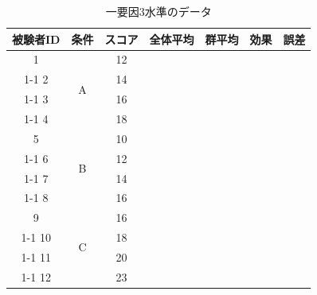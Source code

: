 \documentclass[a4paper,12pt]{ltjarticle}
\begin{document}
\begin{table}[ht]
	\centering
	\caption{一要因3水準のデータ}
	\begin{tabular}{|c|c|c|c|c|c|c|}
		\hline
		被験者ID & 条件 & スコア & 全体平均 & 群平均 & 効果 & 誤差 \\ \hline
		1        & \multirow{4}{*}{A}  & 12   & \multirow{12}{*}{\hspace{2cm}} & \multirow{4}{*}{\hspace{2cm}}  & \multirow{4}{*}{\hspace{2cm}}  & \hspace{2cm}   \\ \cline{1-1}\cline{3-3}\cline{7-7}
		2        &   & 14   &  &   &   & \hspace{2cm}   \\ \cline{1-1}\cline{3-3}\cline{7-7}
		3        &   & 16   &  &   &   & \hspace{2cm}   \\ \cline{1-1}\cline{3-3}\cline{7-7}
		4        &   & 18   &  &   &   & \hspace{2cm}   \\ \hline
		5        & \multirow{4}{*}{B}  & 10   &  & \multirow{4}{*}{\hspace{2cm}}  & \multirow{4}{*}{\hspace{2cm}}  & \hspace{2cm}   \\ \cline{1-1}\cline{3-3}\cline{7-7}
		6        &   & 12   &  &   &   & \hspace{2cm}   \\ \cline{1-1}\cline{3-3}\cline{7-7}
		7        &   & 14   &  &   &   & \hspace{2cm}   \\ \cline{1-1}\cline{3-3}\cline{7-7}
		8        &   & 16   &  &   &   & \hspace{2cm}   \\ \hline
		9        & \multirow{4}{*}{C}  & 16   &  & \multirow{4}{*}{\hspace{2cm}}  & \multirow{4}{*}{\hspace{2cm}}  & \hspace{2cm}   \\ \cline{1-1}\cline{3-3}\cline{7-7}
		10       &   & 18   &  &   &   & \hspace{2cm}   \\ \cline{1-1}\cline{3-3}\cline{7-7}
		11       &   & 20   &  &   &   & \hspace{2cm}   \\ \cline{1-1}\cline{3-3}\cline{7-7}
		12       &   & 23   &  &   &   & \hspace{2cm}   \\ \hline
	\end{tabular}
\end{table}
\end{document}

